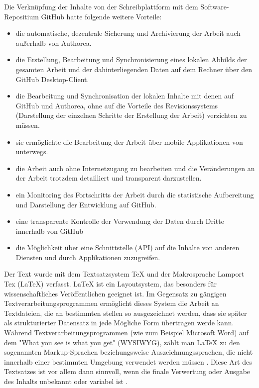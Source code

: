 Die Verknüpfung der Inhalte von der Schreibplattform mit dem Software-Repositium GitHub hatte folgende weitere Vorteile:
\begin{itemize}
\item die automatische, dezentrale Sicherung und Archivierung der Arbeit auch außerhalb von Authorea.
\item die Erstellung, Bearbeitung und Synchronisierung eines lokalen Abbilds der gesamten Arbeit und der dahinterliegenden Daten auf dem Rechner über den GitHub Desktop-Client.
\item die Bearbeitung und Synchronisation der lokalen Inhalte mit denen auf GitHub und Authorea, ohne auf die Vorteile des Revisionssystems (Darstellung der einzelnen Schritte der Erstellung der Arbeit) verzichten zu müssen.
\item sie ermöglichte die Bearbeitung der Arbeit über mobile Applikationen von unterwegs.
\item die Arbeit auch ohne Internetzugang zu bearbeiten und die Veränderungen an der Arbeit trotzdem detailliert und transparent darzustellen.
\item ein Monitoring des Fortschritts der Arbeit durch die statistische Aufbereitung und Darstellung der Entwicklung auf GitHub.
\item eine transparente Kontrolle der Verwendung der Daten durch Dritte innerhalb von GitHub
\item die Möglichkeit über eine Schnittstelle (API) auf die Inhalte von anderen Diensten und durch Applikationen zuzugreifen.
\end{itemize}

Der Text wurde mit dem Textsatzsystem TeX und der Makrosprache Lamport Tex (LaTeX) verfasst. LaTeX ist ein Layoutsystem, das besonders für wissenschaftliches Veröffentlichen geeignet ist. Im Gegensatz zu gängigen Textverarbeitungsprogrammen ermöglicht dieses System die Arbeit an Textdateien, die an bestimmten stellen so ausgezeichnet werden, dass sie später als strukturierter Datensatz in jede Mögliche Form übertragen werde kann. Während Textverarbeitungsprogrammen (wie zum Beispiel Microsoft Word) auf dem "What you see is what you get" (WYSIWYG), zählt man LaTeX zu den sogenannten Markup-­Sprachen beziehungsweise Auszeichnungssprachen, die nicht innerhalb einer bestimmten Umgebung verwendet werden müssen \cite{Sievers_2012}. Diese Art des Textsatzes ist vor allem dann sinnvoll, wenn die finale Verwertung oder Ausgabe des Inhalts unbekannt oder variabel ist  \cite{braune_2007_latex}.

